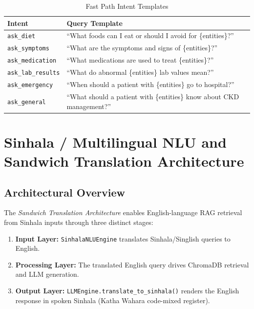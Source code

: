 \documentclass[12pt,a4paper]{report}
\begin{document}
\begin{table}[H]
\centering
\caption{Fast Path Intent Templates}
\label{tab:templates}
\renewcommand{\arraystretch}{1.3}
\begin{tabularx}{\textwidth}{@{}lX@{}}
\toprule
\textbf{Intent} & \textbf{Query Template} \\
\midrule
\texttt{ask\_diet}        & ``What foods can I eat or should I avoid for \{entities\}?'' \\
\texttt{ask\_symptoms}    & ``What are the symptoms and signs of \{entities\}?'' \\
\texttt{ask\_medication}  & ``What medications are used to treat \{entities\}?'' \\
\texttt{ask\_lab\_results} & ``What do abnormal \{entities\} lab values mean?'' \\
\texttt{ask\_emergency}   & ``When should a patient with \{entities\} go to hospital?'' \\
\texttt{ask\_general}     & ``What should a patient with \{entities\} know about CKD management?'' \\
\bottomrule
\end{tabularx}
\end{table}

\section{Sinhala / Multilingual NLU and Sandwich Translation Architecture}

\subsection{Architectural Overview}

The \emph{Sandwich Translation Architecture} enables English-language RAG retrieval from Sinhala inputs through three distinct stages:

\begin{enumerate}
  \item \textbf{Input Layer:} \texttt{SinhalaNLUEngine} translates Sinhala/Singlish queries to English.
  \item \textbf{Processing Layer:} The translated English query drives ChromaDB retrieval and LLM generation.
  \item \textbf{Output Layer:} \texttt{LLMEngine.translate\_to\_sinhala()} renders the English response in spoken Sinhala (Katha Wahara code-mixed register).
\end{enumerate}
\end{document}
